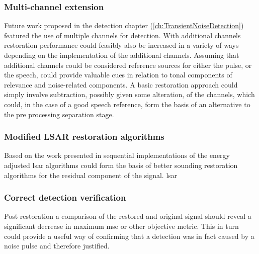 \subsubsection{Multi-channel extension}
Future work proposed in the detection chapter (\ref{ch:TransientNoiseDetection}) featured the use of multiple channels for detection. With additional channels restoration performance could feasibly also be increased in a variety of ways depending on the implementation of the additional channels. Assuming that additional channels could be considered reference sources for either the pulse, or the speech, could provide valuable cues in relation to tonal components of relevance and noise-related components. A basic restoration approach could simply involve subtraction, possibly given some alteration, of the channels, which could, in the case of a good speech reference, form the basis of an alternative to the pre processing separation stage.

\subsubsection{Modified LSAR restoration algorithms}
Based on the work presented in \cite{Esquef2006}\DIFaddbegin \DIFadd{, }\DIFaddend sequential implementations of the energy adjusted \DIFdelbegin {}\DIFdelend \DIFaddbegin \gls{lsar} \DIFaddend algorithms could form the basis of better sounding restoration algorithms for the residual component of the signal. \DIFaddbegin {}\gls{lsar} \DIFaddend 

\subsubsection{Correct detection verification}
Post restoration a comparison of the restored and original signal should reveal a significant decrease in maximum \DIFdelbegin {}\DIFdelend \DIFaddbegin \gls{mse} \DIFaddend or other objective metric. This in turn could provide a useful way of confirming that a detection was in fact caused by a noise pulse and therefore justified.

